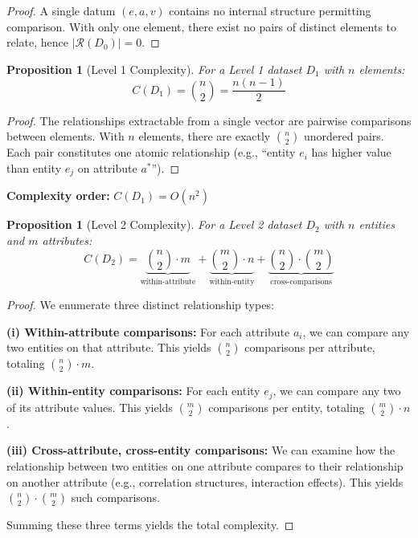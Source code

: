 \documentclass[]{hdsr}
\theoremstyle{plain}      %
\newtheorem{proposition}[theorem]{Proposition}
\theoremstyle{definition} %
\theoremstyle{remark}     %
\begin{document}
\begin{proof}
A single datum $(e, a, v)$ contains no internal structure permitting comparison. With only one element, there exist no pairs of distinct elements to relate, hence $|\mathcal{R}(D_0)| = 0$.
\end{proof}

\begin{proposition}[Level 1 Complexity]
\label{prop:level1}
For a Level 1 dataset $D_1$ with $n$ elements:
\[
C(D_1) = \binom{n}{2} = \frac{n(n-1)}{2}
\]
\end{proposition}

\begin{proof}
The relationships extractable from a single vector are pairwise comparisons between elements. With $n$ elements, there are exactly $\binom{n}{2}$ unordered pairs. Each pair constitutes one atomic relationship (e.g., ``entity $e_i$ has higher value than entity $e_j$ on attribute $a^*$'').
\end{proof}

\noindent\textbf{Complexity order:} $C(D_1) = O(n^2)$

\begin{proposition}[Level 2 Complexity]
\label{prop:level2}
For a Level 2 dataset $D_2$ with $n$ entities and $m$ attributes:
\begin{equation}
C(D_2) = \underbrace{\binom{n}{2} \cdot m}_{\text{within-attribute}} + \underbrace{\binom{m}{2} \cdot n}_{\text{within-entity}} + \underbrace{\binom{n}{2} \cdot \binom{m}{2}}_{\text{cross-comparisons}}
\label{eq:level2complexity}
\end{equation}
\end{proposition}

\begin{proof}
We enumerate three distinct relationship types:

\textbf{(i) Within-attribute comparisons:} For each attribute $a_i$, we can compare any two entities on that attribute. This yields $\binom{n}{2}$ comparisons per attribute, totaling $\binom{n}{2} \cdot m$.

\textbf{(ii) Within-entity comparisons:} For each entity $e_j$, we can compare any two of its attribute values. This yields $\binom{m}{2}$ comparisons per entity, totaling $\binom{m}{2} \cdot n$.

\textbf{(iii) Cross-attribute, cross-entity comparisons:} We can examine how the relationship between two entities on one attribute compares to their relationship on another attribute (e.g., correlation structures, interaction effects). This yields $\binom{n}{2} \cdot \binom{m}{2}$ such comparisons.

Summing these three terms yields the total complexity.
\end{proof}
\end{document}
